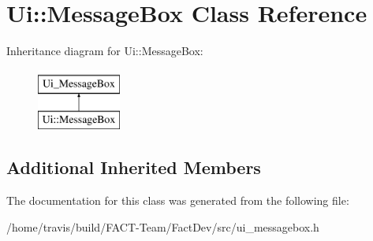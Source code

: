 \hypertarget{classUi_1_1MessageBox}{\section{Ui\-:\-:Message\-Box Class Reference}
\label{classUi_1_1MessageBox}
}
Inheritance diagram for Ui\-:\-:Message\-Box\-:\begin{figure}[H]
\begin{center}
\leavevmode
\includegraphics[height=2.000000cm]{d2/dfb/classUi_1_1MessageBox}
\end{center}
\end{figure}
\subsection*{Additional Inherited Members}


The documentation for this class was generated from the following file\-:\begin{DoxyCompactItemize}
\item 
/home/travis/build/\-F\-A\-C\-T-\/\-Team/\-Fact\-Dev/src/ui\-\_\-messagebox.\-h\end{DoxyCompactItemize}
